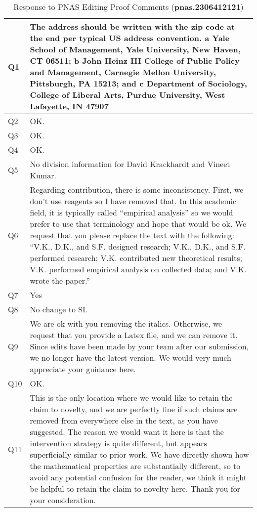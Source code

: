 \documentclass{article}
\begin{document}
\begin{table}
\centering
\caption{Response to PNAS Editing Proof Comments (\textbf{pnas.2306412121})}
\begin{tabular}{p{0.5in}p{6in}}
\toprule
Q1 & The address should be written with the zip code at the end per typical US address convention.
a Yale School of Management, Yale University, New Haven, CT 06511; 
b John Heinz III College of Public Policy and Management, Carnegie Mellon University,  Pittsburgh, PA 15213;
and 
c Department of Sociology, College of Liberal Arts, Purdue University, West Lafayette, IN 47907\\
\midrule
Q2 & OK. \\
\midrule
Q3 & OK.\\
\midrule
Q4 & OK.\\
\midrule
Q5 & No division information for David Krackhardt and Vineet Kumar.
\\
\midrule
Q6 & Regarding contribution, there is some inconsistency. First, we don't use reagents so I have removed that. In this academic field, it is typically called ``empirical analysis'' so we would prefer to use that terminology and hope that would be ok. We request that you please replace the text with the following: ``V.K., D.K., and S.F. designed research; V.K., D.K., and S.F. performed research; V.K. contributed new theoretical results; V.K. performed empirical analysis on collected data; and V.K. wrote the paper.''\\
\midrule
Q7 & Yes\\
\midrule
Q8 & No change to SI.\\
\midrule
Q9 & We are ok with you removing the italics. Otherwise, we request that you provide a Latex file, and we can remove it. Since edits have been made by your team after our submission, we no longer have the latest version. We would very much appreciate your guidance here.\\
\midrule
Q10 & OK.\\
\midrule
Q11 & This is the only location where we would like to retain the claim to novelty, and we are perfectly fine if such claims are removed from everywhere else in the text, as you have suggested. The reason we would want it here is that the intervention strategy is quite different, but appears superficially similar to prior work. We have directly shown how the mathematical properties are substantially different, so to avoid any potential confusion for the reader, we think it might be helpful to retain the claim to novelty here. Thank you for your consideration.\\

\end{tabular}
\end{table}
\end{document}
